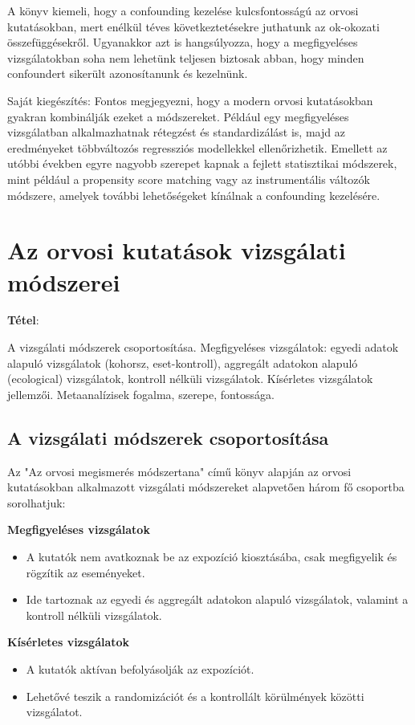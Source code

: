\documentclass[a4paper,12pt]{article}
\begin{document}
A könyv kiemeli, hogy a confounding kezelése kulcsfontosságú az orvosi kutatásokban, mert enélkül téves következtetésekre juthatunk az ok-okozati összefüggésekről. Ugyanakkor azt is hangsúlyozza, hogy a megfigyeléses vizsgálatokban soha nem lehetünk teljesen biztosak abban, hogy minden confoundert sikerült azonosítanunk és kezelnünk.

Saját kiegészítés: Fontos megjegyezni, hogy a modern orvosi kutatásokban gyakran kombinálják ezeket a módszereket. Például egy megfigyeléses vizsgálatban alkalmazhatnak rétegzést és standardizálást is, majd az eredményeket többváltozós regressziós modellekkel ellenőrizhetik. Emellett az utóbbi években egyre nagyobb szerepet kapnak a fejlett statisztikai módszerek, mint például a propensity score matching vagy az instrumentális változók módszere, amelyek további lehetőségeket kínálnak a confounding kezelésére.


\newpage

\section{Az orvosi kutatások vizsgálati módszerei}

\textbf{Tétel}: 

A vizsgálati módszerek csoportosítása. Megfigyeléses vizsgálatok: egyedi adatok alapuló
vizsgálatok (kohorsz, eset-kontroll), aggregált adatokon alapuló (ecological) vizsgálatok,
kontroll nélküli vizsgálatok. Kísérletes vizsgálatok jellemzői. Metaanalízisek fogalma, szerepe,
fontossága.

\subsection{A vizsgálati módszerek csoportosítása}

Az "Az orvosi megismerés módszertana" című könyv alapján az orvosi kutatásokban alkalmazott vizsgálati módszereket alapvetően három fő csoportba sorolhatjuk:

\textbf{Megfigyeléses vizsgálatok}
\begin{itemize} 
\item A kutatók nem avatkoznak be az expozíció kiosztásába, csak megfigyelik és rögzítik az eseményeket.
\item Ide tartoznak az egyedi és aggregált adatokon alapuló vizsgálatok, valamint a kontroll nélküli vizsgálatok.
\end{itemize}

\textbf{Kísérletes vizsgálatok}
\begin{itemize} 
\item A kutatók aktívan befolyásolják az expozíciót.
\item Lehetővé teszik a randomizációt és a kontrollált körülmények közötti vizsgálatot.
\end{itemize}
\end{document}
